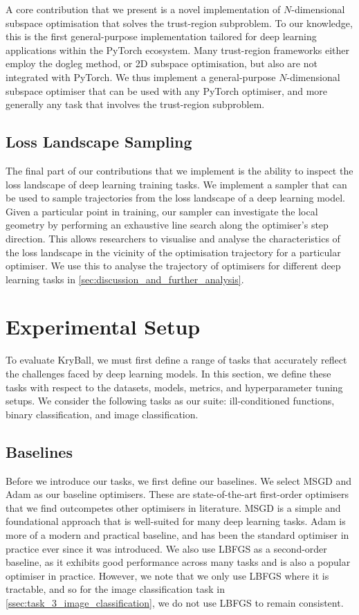 A core contribution that we present is a novel implementation of $N$-dimensional subspace optimisation that solves the trust-region subproblem. To our knowledge, this is the first general-purpose implementation tailored for deep learning applications within the PyTorch ecosystem. Many trust-region frameworks either employ the dogleg method, or 2D subspace optimisation, but also are not integrated with PyTorch. We thus implement a general-purpose $N$-dimensional subspace optimiser that can be used with any PyTorch optimiser, and more generally any task that involves the trust-region subproblem. 

\subsection{Loss Landscape Sampling}
\label{ssec:loss_landscape_sampling}

The final part of our contributions that we implement is the ability to inspect the loss landscape of deep learning training tasks. We implement a sampler that can be used to sample trajectories from the loss landscape of a deep learning model. Given a particular point in training, our sampler can investigate the local geometry by performing an exhaustive line search along the optimiser's step direction. This allows researchers to visualise and analyse the characteristics of the loss landscape in the vicinity of the optimisation trajectory for a particular optimiser. We use this to analyse the trajectory of optimisers for different deep learning tasks in \cref{sec:discussion_and_further_analysis}. 

\section{Experimental Setup}
\label{sec:experimental_setup}
To evaluate KryBall, we must first define a range of tasks that accurately reflect the challenges faced by deep learning models. In this section, we define these tasks with respect to the datasets, models, metrics, and hyperparameter tuning setups. We consider the following tasks as our suite: ill-conditioned functions, binary classification, and image classification.

\subsection{Baselines}
\label{ssec:baselines}
Before we introduce our tasks, we first define our baselines. We select MSGD and Adam as our baseline optimisers. These are state-of-the-art first-order optimisers that we find outcompetes other optimisers in literature. MSGD is a simple and foundational approach that is well-suited for many deep learning tasks. Adam is more of a modern and practical baseline, and has been the standard optimiser in practice ever since it was introduced. We also use LBFGS as a second-order baseline, as it exhibits good performance across many tasks and is also a popular optimiser in practice. However, we note that we only use LBFGS where it is tractable, and so for the image classification task in \cref{ssec:task_3_image_classification}, we do not use LBFGS to remain consistent.

